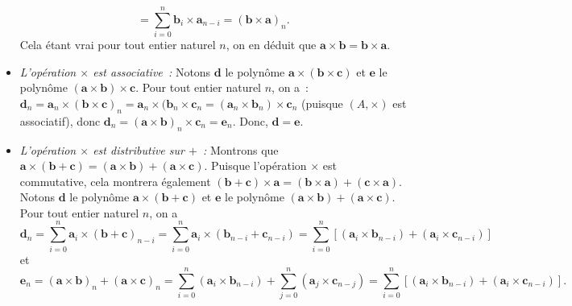 \begin{itemize}[nosep]
\begin{equation*}
            = \sum_{i=0}^n \mathbf{b}_{i} \times \mathbf{a}_{n-i}
            = (\mathbf{b} \times \mathbf{a})_n .
        \end{equation*}
        Cela étant vrai pour tout entier naturel $n$, on en déduit que $\mathbf{a} \times \mathbf{b} = \mathbf{b} \times \mathbf{a}$.
    \item \textit{L'opération $\times$ est associative :}
        Notons $\mathbf{d}$ le polynôme $\mathbf{a} \times (\mathbf{b} \times \mathbf{c})$ et $\mathbf{e}$ le polynôme $(\mathbf{a} \times \mathbf{b}) \times \mathbf{c}$. 
        Pour tout entier naturel $n$, on a : $\mathbf{d}_n = \mathbf{a}_n \times (\mathbf{b} \times \mathbf{c})_n = \mathbf{a}_n \times (\mathbf{b}_n \times \mathbf{c}_n = (\mathbf{a}_n \times \mathbf{b}_n) \times \mathbf{c}_n$ (puisque $(A, \times)$ est associatif), donc $\mathbf{d}_n = (\mathbf{a} \times \mathbf{b})_n \times \mathbf{c}_n = \mathbf{e}_n$.
        Donc, $\mathbf{d} = \mathbf{e}$.
    \item \textit{L'opération $\times$ est distributive sur $+$ :} 
        Montrons que $\mathbf{a} \times (\mathbf{b} + \mathbf{c}) = (\mathbf{a} \times \mathbf{b}) + (\mathbf{a} \times \mathbf{c})$.
        Puisque l'opération $\times$ est commutative, cela montrera également $(\mathbf{b} + \mathbf{c}) \times \mathbf{a} = (\mathbf{b} \times \mathbf{a}) + (\mathbf{c} \times \mathbf{a})$.
        Notons $\mathbf{d}$ le polynôme $\mathbf{a} \times (\mathbf{b} + \mathbf{c})$ et $\mathbf{e}$ le polynôme $(\mathbf{a} \times \mathbf{b}) + (\mathbf{a} \times \mathbf{c})$.
        Pour tout entier naturel $n$, on a 
        \begin{equation*}
            \mathbf{d}_n = \sum_{i=0}^n \mathbf{a}_i \times (\mathbf{b} + \mathbf{c})_{n-i}
                         = \sum_{i=0}^n \mathbf{a}_i \times (\mathbf{b}_{n-i} + \mathbf{c}_{n-i})
                         = \sum_{i=0}^n \left[ (\mathbf{a}_i \times \mathbf{b}_{n-i}) + (\mathbf{a}_i \times \mathbf{c}_{n-i}) \right]
        \end{equation*}
        et
        \begin{equation*}
            \mathbf{e}_n = (\mathbf{a} \times \mathbf{b})_n + (\mathbf{a} \times \mathbf{c})_n
                         = \sum_{i=0}^n  (\mathbf{a}_i \times \mathbf{b}_{n-i}) 
                            + \sum_{j=0}^n (\mathbf{a}_j \times \mathbf{c}_{n-j}) 
                         = \sum_{i=0}^n \left[ (\mathbf{a}_i \times \mathbf{b}_{n-i}) + (\mathbf{a}_i \times \mathbf{c}_{n-i}) \right] .
        \end{equation*}

\end{itemize}
